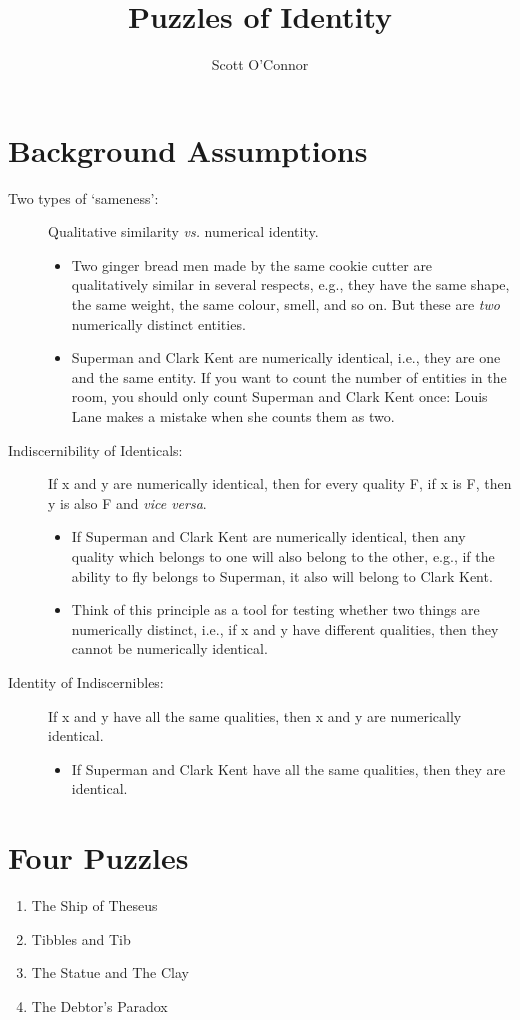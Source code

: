 \documentclass[9pt]{article}
\title{Puzzles of Identity}
\author{Scott O’Connor}
\begin{document}
\maketitle
\section{Background Assumptions}
\begin{description}
\item [Two types of `sameness':] Qualitative similarity \emph{vs.} numerical identity. 
\begin{itemize} 
\item Two ginger bread men made by the same cookie cutter are qualitatively similar in several respects, e.g., they have the same shape, the same weight, the same colour, smell, and so on. But these are \emph{two} numerically distinct entities. 
\item Superman and Clark Kent are numerically identical, i.e., they are one and the same entity. If you want to count the number of entities in the room, you should only count Superman and Clark Kent once: Louis Lane makes a mistake when she counts them as two. 
\end{itemize}
\item [Indiscernibility of Identicals:] If x and y are numerically identical, then for every quality F, if x is F, then y is also F and \emph{vice versa}.  
\begin{itemize}
\item If Superman and Clark Kent are numerically identical, then any quality which belongs to one will also belong to the other, e.g., if the ability to fly belongs to Superman, it also will belong to Clark Kent.
\item Think of this principle as a tool for testing whether two things are numerically distinct, i.e., if x and y have different qualities, then they cannot be numerically identical. 
\end{itemize}
\item [Identity of Indiscernibles:] If x and y have all the same qualities, then x and y are numerically identical. 
\begin{itemize}
\item If Superman and Clark Kent have all the same qualities, then they are identical. 
\end{itemize}
\end{description}

\section{Four Puzzles} 
\begin{enumerate}
\item The Ship of Theseus 
\item Tibbles and Tib 
\item The Statue and The Clay 
\item The Debtor's Paradox 

\end{enumerate}
\end{document}
